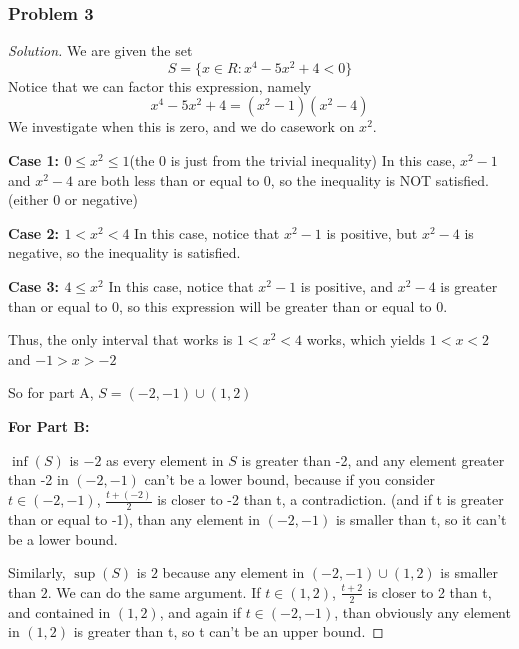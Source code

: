 \documentclass[11pt]{article}
\newcommand{\1}{\mathbf{1}}
\theoremstyle{definition}
\newenvironment{solution}{\begin{proof}[Solution]}{\end{proof}}
\begin{document}
\subsubsection*{Problem 3}
\begin{solution}
    We are given the set $$S  = \{ x \in R : x^4 - 5x^2 + 4 < 0\}$$
    Notice that we can factor this expression, namely $$x^4 - 5x^2 + 4 = (x^2 - 1)(x^2 -
    4)$$
    We investigate when this is zero, and we do casework on $x^2.$
\par    \textbf{Case 1: $0 \le x^2 \le 1$}(the 0 is just from the trivial inequality) In this
    case, $x^2 - 1$ and $x^2 - 4$ are both less than or equal to 0, so the inequality is NOT
    satisfied.(either 0 or negative)
    \par \textbf{Case 2: $1 < x^2 < 4$} In this case, notice that $x^2 - 1$ is positive,
    but $x^2 - 4$ is negative, so the inequality is satisfied.
    \par \textbf{Case 3: $4 \le x^2$} In this case, notice that  $x^2 - 1$ is positive,
    and $x^2 - 4$ is greater than or equal to 0, so this expression will be greater than
    or equal to 0.

    \par Thus, the only interval that works is $1 < x^2 < 4$ works, which yields $1 < x
    < 2$ and $-1 > x > -2$
    \par So for part A, $S = \left(-2, -1\right) \cup \left(1, 2\right)$
    \par \textbf{For Part B:}
    \par $\inf(S)$ is $-2$ as every element in $S$ is greater than -2, and any element
    greater than -2 in $(-2, -1)$ can't be a lower bound, because if you consider $t \in
    (-2, -1)$, $\frac{t + (-2)}{2}$ is closer to -2 than t, a contradiction. (and if t
    is greater than or equal to -1), than any element in $(-2, -1)$ is smaller than t,
    so it can't be a lower bound.

    \par Similarly, $\sup(S)$ is $2$ because any element in $(-2, -1) \cup (1, 2)$ is
    smaller than $2$. We can do the same argument. If $t \in (1, 2)$, $\frac{t+2}{2}$ is
    closer to 2 than t, and contained in $(1, 2)$, and again if $t \in (-2, -1)$, than
    obviously any element in $(1, 2)$ is greater than t, so t can't be an upper bound.
\end{solution}
\end{document}
